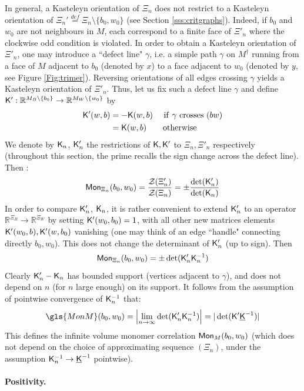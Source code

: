 \documentclass[10pt]{article}
\newcommand{\R}{\mathbb{R}}
\newcommand{\mc}{\mathcal}
\newcommand{\rK}{{\sf K}}
\newcommand{\uK}{{\underline {\sf K}}}
\newcommand{\dg}{\dagger}
\newcommand{\Mon}{{\sf Mon}}
\begin{document}
In general, a Kasteleyn orientation of $\Xi_n$ does not restrict to a Kasteleyn orientation of $\Xi_n'\stackrel{def}{=}\Xi_n\setminus\{b_0,w_0\}$ (see Section \ref{sss:critgraphs}). Indeed, if $b_0$ and $w_0$ are not neighbours in $M$, each correspond to a finite face of $\Xi'_n$ where the clockwise odd condition is violated. In order to 
obtain a Kasteleyn orientation of $\Xi'_n$, one may introduce a ``defect line" $\gamma$, i.e. a simple path $\gamma$ on $M^\dg$ running from a face of $M$ adjacent to $b_0$ (denoted by $x$) to a face adjacent to $w_0$ (denoted by $y$, see Figure \ref{Fig:trimer}). Reversing orientations of all edges crossing $\gamma$ yields  a Kasteleyn orientation of $\Xi'_n$. Thus, let us fix such a defect line $\gamma$ and define $\rK':\R^{M_B\setminus\{b_0\}}\rightarrow\R^{M_W\setminus\{w_0\}}$ by 
\begin{equation} \label{eq:Kprime}
\begin{split}
\rK'(w,b) & =-\rK(w,b){\rm\ \ \ \  if\ }\gamma{\rm\ crosses\ }(bw) \\
 & =\rK(w,b){\rm\ \ \ \ \ \ otherwise}
\end{split}
\end{equation}
We denote by $\rK_{n}$, $\rK'_{n}$ the restrictions of $\rK,\rK'$ to $\Xi_n,\Xi'_n$ respectively (throughout this section, the prime recalls the sign change across the defect line). Then \cite{FisSte2}:
$$\Mon_{\Xi_n}(b_0,w_0)=\frac{{\mc Z}(\Xi'_n)}{{\mc Z}(\Xi_n)}=\pm\frac{\det(\rK'_n)}{\det(\rK_{n})}
$$
In order to compare $\rK'_{n}$, $\rK_{n}$, it is rather convenient to extend $\rK'_{n}$ to an operator $\R^{\Xi_B}\rightarrow\R^{\Xi_W}$ by setting $\rK'(w_0,b_0)=1$, with all other new matrices elements $\rK'(w_0,b),\rK'(w,b_0)$ vanishing (one may think of an edge ``handle" connecting directly $b_0,w_0$). This does not change the determinant of $\rK'_{n}$ (up to sign). Then 
$$\Mon_{\Xi_n}(b_0,w_0)=\pm\det(\rK'_n\rK_{n}^{-1})$$
Clearly $\rK'_n-\rK_n$ has bounded support (vertices adjacent to $\gamma$), and does not depend on $n$ (for $n$ large enough) on its support. It follows from the assumption of pointwise convergence of $\rK_n^{-1}$ that: 
$$\gls{MonM}(b_0,w_0)=\left|\lim_{n\rightarrow\infty}\det(\rK'_n\rK_n^{-1})\right|=|\det(\rK'\uK^{-1})|$$  
This defines the infinite volume monomer correlation $\Mon_M(b_0,w_0)$ (which does not depend on the choice of approximating sequence $(\Xi_n)$, under the assumption $\rK_n^{-1}\rightarrow\uK^{-1}$ pointwise). 

\paragraph{Positivity.\\}
\end{document}
